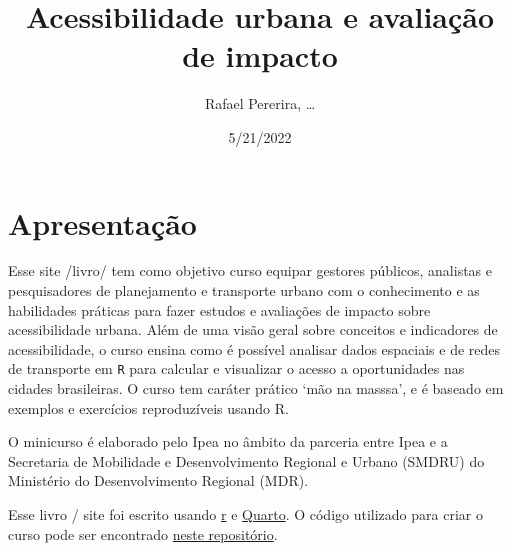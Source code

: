 \documentclass[
  letterpaper,
  DIV=11,
  numbers=noendperiod]{scrreprt}
\title{Acessibilidade urbana e avaliação de impacto}
\author{Rafael Pererira, \ldots{}}
\date{5/21/2022}
\renewcommand*\contentsname{Table of contents}
\newcommand\contentsname{Table of contents}
\begin{document}
\maketitle
\ifdefined\Shaded\renewenvironment{Shaded}{\begin{tcolorbox}[interior hidden, borderline west={3pt}{0pt}{shadecolor}, enhanced, boxrule=0pt, breakable, sharp corners, frame hidden]}{\end{tcolorbox}}\fi

\renewcommand*\contentsname{Table of contents}
{
\hypersetup{linkcolor=}
\setcounter{tocdepth}{2}
\tableofcontents
}
\hypertarget{apresentauxe7uxe3o}{%
\section*{Apresentação}\label{apresentauxe7uxe3o}}

Esse site /livro/ tem como objetivo curso equipar gestores públicos,
analistas e pesquisadores de planejamento e transporte urbano com o
conhecimento e as habilidades práticas para fazer estudos e avaliações
de impacto sobre acessibilidade urbana. Além de uma visão geral sobre
conceitos e indicadores de acessibilidade, o curso ensina como é
possível analisar dados espaciais e de redes de transporte em \texttt{R}
para calcular e visualizar o acesso a oportunidades nas cidades
brasileiras. O curso tem caráter prático `mão na masssa', e é baseado em
exemplos e exercícios reproduzíveis usando R.

O minicurso é elaborado pelo Ipea no âmbito da parceria entre Ipea e a
Secretaria de Mobilidade e Desenvolvimento Regional e Urbano (SMDRU) do
Ministério do Desenvolvimento Regional (MDR).

\begin{tcolorbox}[enhanced jigsaw, colframe=quarto-callout-note-color-frame, opacityback=0, toprule=.15mm, breakable, left=2mm, colback=white, arc=.35mm, rightrule=.15mm, bottomrule=.15mm, leftrule=.75mm]
\begin{minipage}[t]{5.5mm}
\textcolor{quarto-callout-note-color}{\faInfo}
\end{minipage}%
\begin{minipage}[t]{\textwidth - 5.5mm}
Esse livro / site foi escrito usando
\href{https://www.r-project.org/}{r} e
\href{https://quarto.org}{Quarto}. O código utilizado para criar o curso
pode ser encontrado
\href{https://github.com/ipeaGIT/aop_curso/tree/main/aop_curso_pt}{neste
repositório}.\end{minipage}%
\end{tcolorbox}
\end{document}
